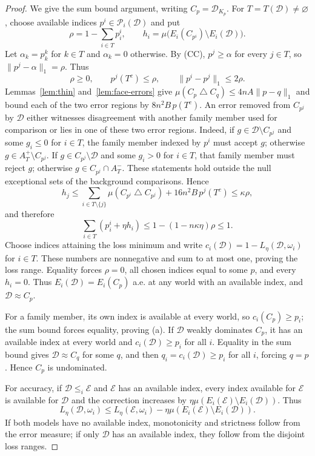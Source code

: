 \documentclass[11pt]{article}
\theoremstyle{remark}
\newcommand{\sd}{\mathbin{\triangle}}
\newcommand{\Dscr}{\mathcal D}
\newcommand{\Escr}{\mathcal E}
\begin{document}
\begin{proof}
We give the sum bound argument, writing $C_{p}=\Dscr_{K_p}$. For
$T=T(\Dscr)\ne\varnothing$, choose available indices $p^i\in\mathcal P_i(\Dscr)$ and put
\[
 \rho=1-\sum_{i\in T}p^i_i,\qquad
 h_i=\mu\big(E_i(C_{p^i})\setminus E_i(\Dscr)\big).
\]
Let $\alpha_k=p^k_k$ for $k\in T$ and $\alpha_k=0$ otherwise. By (CC),
$p^j\ge\alpha$ for every $j\in T$, so $\|p^j-\alpha\|_1=\rho$. Thus
\[
 \rho\ge0,\qquad p^j(T^c)\le\rho,\qquad
 \|p^i-p^j\|_1\le2\rho.
\]
Lemmas~\ref{lem:thin} and~\ref{lem:face-errors} give
$\mu(C_{p}\sd C_{q})\le4nA\|p-q\|_1$ and bound each of the two error regions by
$8n^2B\,p(T^c)$.
An error removed from $C_{p^j}$ by $\Dscr$ either witnesses disagreement with
another family member used for comparison or lies in one of these two error regions. Indeed,
if $g\in \Dscr\setminus C_{p^j}$ and some $g_i\le0$ for $i\in T$, the family member indexed by $p^i$ must accept $g$; otherwise $g\in A_T^+\setminus C_{p^j}$. If
$g\in C_{p^j}\setminus \Dscr$ and some $g_i>0$ for $i\in T$, that family member must reject $g$; otherwise $g\in C_{p^j}\cap A_T^-$. These statements hold outside
the null exceptional sets of the background comparisons. Hence
\[
 h_j\le\sum_{i\in T\setminus\{j\}}\mu(C_{p^i}\sd C_{p^j})
       +16n^2B\,p^j(T^c)\le\kappa\rho,
\]
and therefore
\begin{equation}
 \sum_{i\in T}(p^i_i+\eta h_i)
 \le1-(1-n\kappa\eta)\rho\le1.\label{eq:numerical-budget}
\end{equation}
Choose indices attaining the loss minimum and write $c_i(\Dscr)=1-L_\eta(\Dscr,\omega_i)$
for $i\in T$. These numbers are nonnegative and sum to at most one, proving
the loss range. Equality forces $\rho=0$, all chosen indices equal to some
$p$, and every $h_i=0$. Thus $E_i(\Dscr)=E_i(C_{p})$ a.e. at any world with an available index,
and $\Dscr\approx C_{p}$.

For a family member, its own index is available at every world, so
$c_i(C_{p})\ge p_i$; the sum bound forces equality, proving (a). If $\Dscr$ weakly
dominates $C_{p}$, it has an available index at every world and $c_i(\Dscr)\ge p_i$ for all $i$.
Equality in the sum bound gives $\Dscr\approx C_{q}$ for some $q$, and then
$q_i=c_i(\Dscr)\ge p_i$ for all $i$, forcing $q=p$. Hence $C_{p}$ is undominated.

For accuracy, if $\Dscr\le_i\Escr$ and $\Escr$ has an available index, every index available for $\Escr$ is available for $\Dscr$
and the correction increases by $\eta\mu(E_i(\Escr)\setminus E_i(\Dscr))$. Thus
\[
 L_\eta(\Dscr,\omega_i)\le L_\eta(\Escr,\omega_i)-\eta\mu(E_i(\Escr)\setminus E_i(\Dscr)).
\]
If both models have no available index, monotonicity and strictness follow from the
error measure; if only $\Dscr$ has an available index, they follow from the disjoint loss ranges.


\end{proof}
\end{document}
